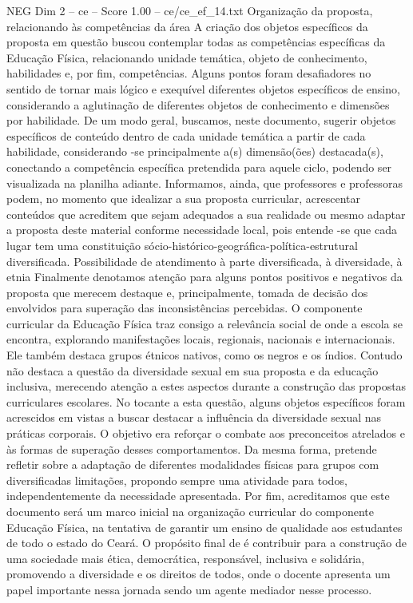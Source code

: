 \begin{textsample}{NEG Dim 2 – ce – Score 1.00 – ce/ce\_ef\_14.txt}  \label{ex:f2_neg_203}
Organização da proposta, relacionando às competências da área A criação dos objetos específicos da proposta em questão buscou contemplar todas as competências específicas da Educação Física, relacionando unidade temática, objeto de conhecimento, habilidades e, por fim, competências.
Alguns pontos foram desafiadores no sentido de tornar mais lógico e exequível diferentes objetos específicos de ensino, considerando a aglutinação de diferentes objetos de conhecimento e dimensões por habilidade.
De um modo geral, buscamos, neste documento, sugerir objetos específicos de conteúdo dentro de cada unidade temática a partir de cada habilidade, considerando -se principalmente a(s) dimensão(ões) destacada(s), conectando a competência específica pretendida para aquele ciclo, podendo ser visualizada na planilha adiante.
Informamos, ainda, que professores e professoras podem, no momento que idealizar a sua proposta curricular, acrescentar conteúdos que acreditem que sejam adequados a sua realidade ou mesmo adaptar a proposta deste material conforme necessidade local, pois entende -se que cada lugar tem uma constituição sócio-histórico-geográfica-política-estrutural diversificada.
Possibilidade de atendimento à parte diversificada, à diversidade, à etnia Finalmente denotamos atenção para alguns pontos positivos e negativos da proposta que merecem destaque e, principalmente, tomada de decisão dos envolvidos para superação das inconsistências percebidas.
O componente curricular da Educação Física traz consigo a relevância social de onde a escola se encontra, explorando manifestações locais, regionais, nacionais e internacionais.
Ele também destaca grupos étnicos nativos, como os negros e os índios.
Contudo não destaca a questão da diversidade sexual em sua proposta e da educação inclusiva, merecendo atenção a estes aspectos durante a construção das propostas curriculares escolares.
No tocante a esta questão, alguns objetos específicos foram acrescidos em vistas a buscar destacar a influência da diversidade sexual nas práticas corporais.
O objetivo era reforçar o combate aos preconceitos atrelados e às formas de superação desses comportamentos.
Da mesma forma, pretende refletir sobre a adaptação de diferentes modalidades físicas para grupos com diversificadas limitações, propondo sempre uma atividade para todos, independentemente da necessidade apresentada.
Por fim, acreditamos que este documento será um marco inicial na organização curricular do componente Educação Física, na tentativa de garantir um ensino de qualidade aos estudantes de todo o estado do Ceará.
O propósito final de é contribuir para a construção de uma sociedade mais ética, democrática, responsável, inclusiva e solidária, promovendo a diversidade e os direitos de todos, onde o docente apresenta um papel importante nessa jornada sendo um agente mediador nesse processo.

\end{textsample}
